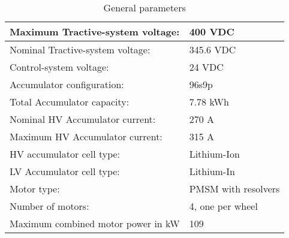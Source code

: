 \iffalse
\begin{itemize}
\item Short description of the system’s concept 
\item Rough Schematic (blocks) showing all parts affected with the electrical systems and function of the tractive-system
\item No detailed wiring
\item Additionally, fill out the following table, replacing the values with your specifications:
\end{itemize}
\fi

\begin{table}[H]
	\centering
	\caption{General parameters}
	\begin{tabularx}{\textwidth}{|X|X|}
		\hline
		Maximum Tractive-system voltage: & 400 VDC  \\[\TableSize]
		\hline Nominal Tractive-system voltage: & 345.6 VDC\\[\TableSize]
		\hline
		Control-system voltage: & 24 VDC \\[\TableSize]
		\hline
		Accumulator configuration: & 96s9p \\[\TableSize]
		\hline
		Total Accumulator capacity: & 7.78 kWh\\[\TableSize]
		\hline
		Nominal HV Accumulator current: & 270 A \\[\TableSize]
		\hline
		Maximum HV Accumulator current: & 315 A \\[\TableSize]
		\hline
		HV accumulator cell type: & Lithium-Ion  \\[\TableSize]
		\hline
		LV Accumulator cell type: & Lithium-In \\[\TableSize]
		\hline
		Motor type: & PMSM with resolvers \\[\TableSize]
		\hline
		Number of motors: &  4, one per wheel \\[\TableSize]
		\hline
		Maximum combined motor power in kW & 109 \\[\TableSize]
		\hline
	\end{tabularx}%
	\label{tab:system-general}%
\end{table}%

